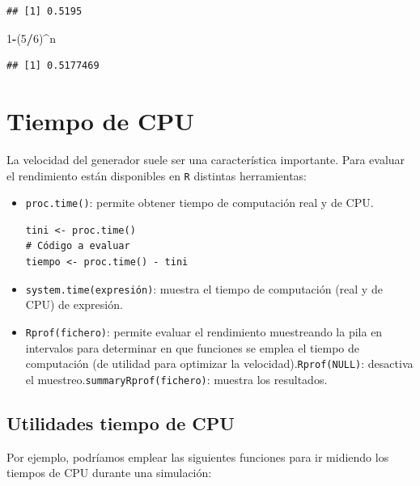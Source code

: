 \documentclass[]{book}
\newenvironment{Shaded}{\begin{snugshade}}{\end{snugshade}}
\newcommand{\DecValTok}[1]{\textcolor[rgb]{0.00,0.00,0.81}{#1}}
\newcommand{\OperatorTok}[1]{\textcolor[rgb]{0.81,0.36,0.00}{\textbf{#1}}}
\newcommand{\NormalTok}[1]{#1}
\theoremstyle{definition}
\theoremstyle{definition}
\theoremstyle{definition}
\theoremstyle{remark}
\begin{document}
\begin{enumerate}
\begin{verbatim}
## [1] 0.5195
\end{verbatim}

\begin{Shaded}
\begin{Highlighting}[]
\DecValTok{1}\OperatorTok{-}\NormalTok{(}\DecValTok{5}\OperatorTok{/}\DecValTok{6}\NormalTok{)}\OperatorTok{^}\NormalTok{n}
\end{Highlighting}
\end{Shaded}

\begin{verbatim}
## [1] 0.5177469
\end{verbatim}
\end{enumerate}

\section{Tiempo de CPU}\label{tiempo-de-cpu}

La velocidad del generador suele ser una característica importante. Para
evaluar el rendimiento están disponibles en \texttt{R} distintas
herramientas:

\begin{itemize}
\item
  \texttt{proc.time()}: permite obtener tiempo de computación real y de
  CPU.

\begin{verbatim}
tini <- proc.time()
# Código a evaluar
tiempo <- proc.time() - tini
\end{verbatim}
\item
  \texttt{system.time(expresión)}: muestra el tiempo de computación
  (real y de CPU) de expresión.
\item
  \texttt{Rprof(fichero)}: permite evaluar el rendimiento muestreando la
  pila en intervalos para determinar en que funciones se emplea el
  tiempo de computación (de utilidad para optimizar la
  velocidad).\texttt{Rprof(NULL)}: desactiva el
  muestreo.\texttt{summaryRprof(fichero)}: muestra los resultados.
\end{itemize}

\subsection{Utilidades tiempo de CPU}\label{utilidades-tiempo-de-cpu}

Por ejemplo, podríamos emplear las siguientes funciones para ir midiendo
los tiempos de CPU durante una simulación:
\end{document}
